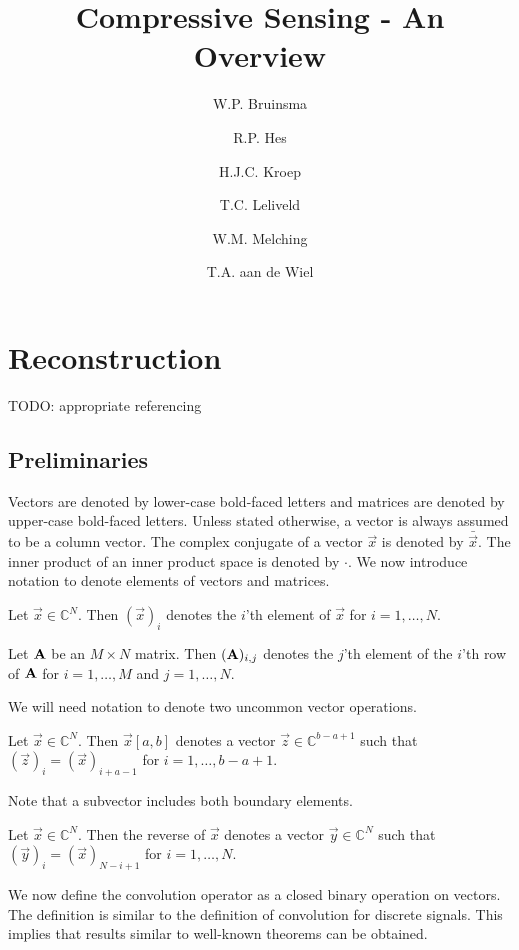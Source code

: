 \documentclass[a4paper, openany, oneside]{memoir}
\title{Compressive Sensing - An Overview}
\author{W.P. Bruinsma \and R.P. Hes \and H.J.C. Kroep \and T.C. Leliveld \and W.M. Melching \and T.A. aan de Wiel}
\begin{document}
\chapter{Reconstruction}
TODO: appropriate referencing

\section{Preliminaries}
Vectors are denoted by lower-case bold-faced letters and matrices are denoted by upper-case bold-faced letters. Unless stated otherwise, a vector is always assumed to be a column vector. The complex conjugate of a vector $\vec{x}$ is denoted by $\bar{\vec{x}}$. The inner product of an inner product space is denoted by $\cdot$. We now introduce notation to denote elements of vectors and matrices.

\begin{blockDefinition}
    Let $\vec{x} \in \mathbb{C}^N$. Then $(\vec{x})_i$ denotes the $i$'th element of $\vec{x}$ for $i = 1,\ldots,N$.
\end{blockDefinition}

\begin{blockDefinition}
    Let $\boldsymbol{\mathbf{A}}$ be an $M \times N$ matrix. Then $(\boldsymbol{\mathbf{A}})_{i,j}$ denotes the $j$'th element of the $i$'th row of $\boldsymbol{\mathbf{A}}$ for $i = 1,\ldots,M$ and $j=1,\ldots,N$.
\end{blockDefinition}

We will need notation to denote two uncommon vector operations.

\begin{blockDefinition}[Subvector]
    Let $\vec{x} \in \mathbb{C}^N$. Then $\vec{x}[a,b]$ denotes a vector $\vec{z} \in \mathbb{C}^{b-a+1}$ such that $(\vec{z})_i = (\vec{x})_{i+a-1}$ for $i = 1,\ldots,b-a+1$.
\end{blockDefinition}

Note that a subvector includes both boundary elements.

\begin{blockDefinition}
    Let $\vec{x} \in \mathbb{C}^N$. Then the reverse of $\vec{x}$ denotes a vector $\vec{y} \in \mathbb{C}^N$ such that $(\vec{y})_i = (\vec{x})_{N-i+1}$ for $i = 1,\ldots,N$.
\end{blockDefinition}

We now define the convolution operator as a closed binary operation on vectors. The definition is similar to the definition of convolution for discrete signals. This implies that results similar to well-known theorems can be obtained.
\end{document}
